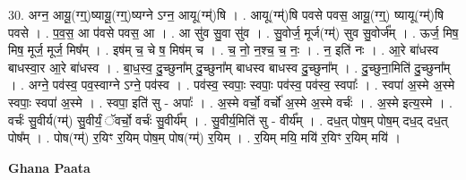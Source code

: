 \documentclass[17pt]{extarticle}
\begin{document}
30. अग्न॒ आयू॒(ग्ग्॒)ष्यायू॒(ग्ग्॒)ष्यग्ने ऽग्न॒ आयू(ग्म्॑)षि । . आयू(ग्म्॑)षि पवसे पवस॒ आयू॒(ग्ग्॒) ष्यायू(ग्म्॑)षि पवसे । . प॒व॒स॒ आ प॑वसे पवस॒ आ । . आ सु॑व सु॒वा सु॑व । . सु॒वोर्ज॒ मूर्ज(ग्म्॑) सुव सु॒वोर्ज᳚म् । . ऊर्ज॒ मिष॒ मिष॒ मूर्ज॒ मूर्ज॒ मिष᳚म् । . इष॑म् च॒ चे ष॒ मिष॑म् च । . च॒ नो॒ न॒श्च॒ च॒ नः॒ । . न॒ इति॑ नः । . आ॒रे बा॑धस्व बाधस्वा॒र आ॒रे बा॑धस्व । . बा॒ध॒स्व॒ दु॒च्छुना᳚म् दु॒च्छुना᳚म् बाधस्व बाधस्व दु॒च्छुना᳚म् । . दु॒च्छुना॒मिति॑ दु॒च्छुना᳚म् । . अग्ने॒ पव॑स्व॒ पव॒स्वाग्ने ऽग्ने॒ पव॑स्व । . पव॑स्व॒ स्वपाः॒ स्वपाः॒ पव॑स्व॒ पव॑स्व॒ स्वपाः᳚ । . स्वपा॑ अ॒स्मे अ॒स्मे स्वपाः॒ स्वपा॑ अ॒स्मे । . स्वपा॒ इति॑ सु - अपाः᳚ । . अ॒स्मे वर्चो॒ वर्चो॑ अ॒स्मे अ॒स्मे वर्चः॑ । . अ॒स्मे इत्य॒स्मे । . वर्चः॑ सु॒वीर्य(ग्म्॑) सु॒वीर्यं॒ ॅवर्चो॒ वर्चः॑ सु॒वीर्य᳚म् । . सु॒वीर्य॒मिति॑ सु - वीर्य᳚म् । . दध॒त् पोष॒म् पोष॒म् दध॒द् दध॒त् पोष᳚म् । . पोष(ग्म्॑) र॒यिꣳ र॒यिम् पोष॒म् पोष(ग्म्॑) र॒यिम् । . र॒यिम् मयि॒ मयि॑ र॒यिꣳ र॒यिम् मयि॑ । \newline

\textbf{Ghana Paata } \newline
\end{document}
